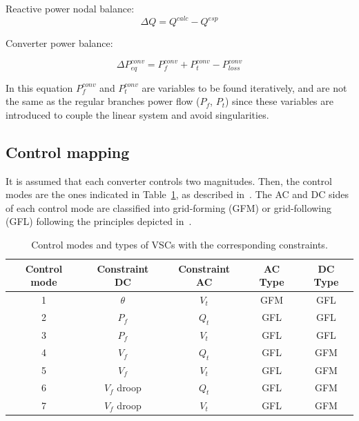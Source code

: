 \documentclass[11pt]{article}
\begin{document}
	
	Reactive power nodal balance:
	\begin{equation}
		\Delta Q = Q^{calc} - Q^{esp}
	\end{equation}
	
		
	Converter power balance:
	
	\begin{equation}
		\Delta P_{eq}^{conv} = P_f^{conv} + P_t^{conv} - P_{loss}^{conv}
	\end{equation}
	
	In this equation $P_f^{conv}$ and $P_t^{conv}$ are variables to be found iteratively, and are not the same as the regular branches power flow ($P_f$, $P_t$) since these variables are introduced to couple the linear system and avoid singularities.
	
	
	

	\newpage

	\subsection{Control mapping}
	It is assumed that each converter controls two magnitudes. Then, the control modes are the ones indicated in Table~\ref{table:contr_vsc}, as described in~\cite{alvarez2021universal}. The AC and DC sides of each control mode are classified into grid-forming (GFM) or grid-following (GFL) following the principles depicted in~\cite{gomis2020principles}.

	\begin{table}[!htb]\centering
		\caption{Control modes and types of VSCs with the corresponding constraints.}
		\begin{tabular}{ccccc}
			\hline
			\textbf{Control mode} & \textbf{Constraint DC} & \textbf{Constraint AC} & \textbf{AC Type} & \textbf{DC Type} \\
			\hline
			\hline
			1 & $\theta$ & $V_t$ & GFM & GFL \\
			2 & $P_f$ & $Q_t$ & GFL & GFL \\
			3 & $P_f$ & $V_t$ & GFL & GFL \\
			4 & $V_f$ & $Q_t$ & GFL & GFM \\
			5 & $V_f$ & $V_t$ & GFL & GFM \\
			6 & $V_f$ droop & $Q_t$ & GFL & GFM \\
			7 & $V_f$ droop & $V_t$ & GFL & GFM \\
			\hline
		\end{tabular}
		\label{table:contr_vsc}
	\end{table}
\end{document}

